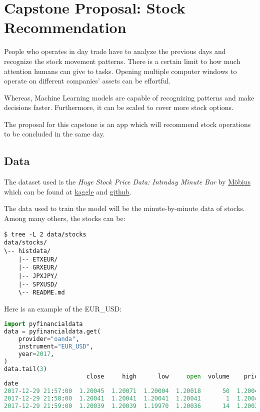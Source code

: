 \documentclass[12pt,openright,hidelinks,twoside,a4paper,english,french,spanish]{abntex2}
\begin{document}

\hypertarget{capstone-proposal}{%
\section*{Capstone Proposal: Stock Recommendation}\label{capstone-proposal}}

People who operates in day trade have to analyze the previous days and
recognize the stock movement patterns. There is a certain limit to how
much attention humans can give to tasks. Opening multiple computer
windows to operate on different companies' assets can be effortful.

Whereas, Machine Learning models are capable of recognizing patterns and
make decisions faster. Furthermore, it can be scaled to cover more stock
options.

The proposal for this capstone is an app which will recommend stock
operations to be concluded in the same day.

\hypertarget{data}{%
\subsection*{Data}\label{data}}

The dataset used is the \emph{Huge Stock Price Data: Intraday Minute
Bar} by \href{https://www.kaggle.com/arashnic}{M\"{o}bius} which can be
found at
\href{https://www.kaggle.com/datasets/arashnic/stock-data-intraday-minute-bar}{kaggle}
and
\href{https://github.com/FutureSharks/financial-data/tree/master/pyfinancialdata}{github}.

The data used to train the model will be the minute-by-minute data of
stocks. Among many others, the stocks can be:

\begin{lstlisting}
$ tree -L 2 data/stocks
data/stocks/
\-- histdata/
    |-- ETXEUR/
    |-- GRXEUR/
    |-- JPXJPY/
    |-- SPXUSD/
    \-- README.md
\end{lstlisting}

Here is an example of the EUR\_USD:

\begin{lstlisting}[language=Python]
import pyfinancialdata
data = pyfinancialdata.get(
    provider="oanda",
	instrument="EUR_USD",
	year=2017,
)
data.tail(3)
                       close     high      low     open  volume    price
date
2017-12-29 21:57:00  1.20045  1.20071  1.20004  1.20018      50  1.20045
2017-12-29 21:58:00  1.20041  1.20041  1.20041  1.20041       1  1.20041
2017-12-29 21:59:00  1.20039  1.20039  1.19970  1.20036      14  1.20039
\end{lstlisting}
\end{document}
